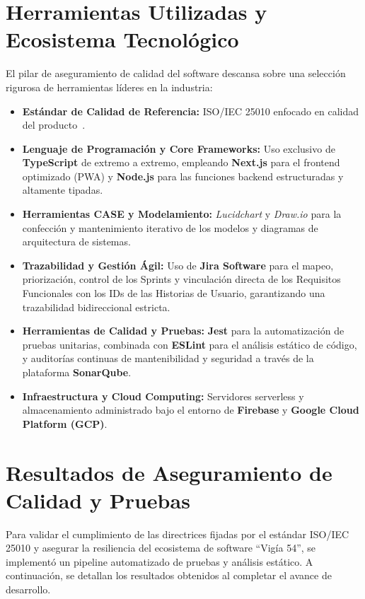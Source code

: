 \documentclass[conference]{IEEEtran}
\begin{document}
\section{Herramientas Utilizadas y Ecosistema Tecnológico}
El pilar de aseguramiento de calidad del software descansa sobre una selección rigurosa de herramientas líderes en la industria:
\begin{itemize}
    \item \textbf{Estándar de Calidad de Referencia:} ISO/IEC 25010 enfocado en calidad del producto~\cite{iso25010}.
    \item \textbf{Lenguaje de Programación y Core Frameworks:} Uso exclusivo de \textbf{TypeScript} de extremo a extremo, empleando \textbf{Next.js} para el frontend optimizado (PWA) y \textbf{Node.js} para las funciones backend estructuradas y altamente tipadas.
    \item \textbf{Herramientas CASE y Modelamiento:} \textit{Lucidchart} y \textit{Draw.io} para la confección y mantenimiento iterativo de los modelos y diagramas de arquitectura de sistemas.
    \item \textbf{Trazabilidad y Gestión Ágil:} Uso de \textbf{Jira Software} para el mapeo, priorización, control de los Sprints y vinculación directa de los Requisitos Funcionales con los IDs de las Historias de Usuario, garantizando una trazabilidad bidireccional estricta.
    \item \textbf{Herramientas de Calidad y Pruebas:} \textbf{Jest} para la automatización de pruebas unitarias, combinada con \textbf{ESLint} para el análisis estático de código, y auditorías continuas de mantenibilidad y seguridad a través de la plataforma \textbf{SonarQube}.
    \item \textbf{Infraestructura y Cloud Computing:} Servidores serverless y almacenamiento administrado bajo el entorno de \textbf{Firebase} y \textbf{Google Cloud Platform (GCP)}.
\end{itemize}

\section{Resultados de Aseguramiento de Calidad y Pruebas}
Para validar el cumplimiento de las directrices fijadas por el estándar ISO/IEC 25010 y asegurar la resiliencia del ecosistema de software ``Vigía 54'', se implementó un pipeline automatizado de pruebas y análisis estático. A continuación, se detallan los resultados obtenidos al completar el avance de desarrollo.
\end{document}
